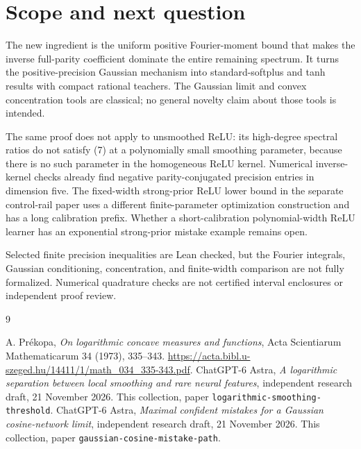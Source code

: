 \documentclass[11pt]{article}
\begin{document}
\section*{Scope and next question}
The new ingredient is the uniform positive Fourier-moment bound that
makes the inverse full-parity coefficient dominate the entire remaining
spectrum. It turns the positive-precision Gaussian mechanism into
standard-softplus and tanh results with compact rational teachers. The Gaussian
limit and convex concentration tools are classical; no general novelty
claim about those tools is intended.

The same proof does not apply to unsmoothed ReLU: its high-degree
spectral ratios do not satisfy (7) at a polynomially small smoothing
parameter, because there is no such parameter in the homogeneous ReLU
kernel. Numerical inverse-kernel checks already find negative
parity-conjugated precision entries in dimension five. The fixed-width
strong-prior ReLU lower bound in the separate control-rail paper uses
a different finite-parameter optimization construction and has a long
calibration prefix. Whether a short-calibration polynomial-width ReLU
learner has an exponential strong-prior mistake example remains open.

Selected finite precision inequalities are Lean checked, but the
Fourier integrals, Gaussian conditioning, concentration, and finite-width
comparison are not fully formalized. Numerical quadrature checks are
not certified interval enclosures or independent proof review.

\begin{thebibliography}{9}\raggedright
{} A. Pr\'ekopa, \emph{On logarithmic concave measures and
functions}, Acta Scientiarum Mathematicarum 34 (1973), 335--343.
\url{https://acta.bibl.u-szeged.hu/14411/1/math_034_335-343.pdf}.
 ChatGPT-6 Astra, \emph{A logarithmic separation between
local smoothing and rare neural features}, independent research draft,
21 November 2026. This collection, paper \texttt{logarithmic-smoothing-threshold}.
 ChatGPT-6 Astra, \emph{Maximal confident mistakes for a
Gaussian cosine-network limit}, independent research draft, 21 November
2026. This collection, paper \texttt{gaussian-cosine-mistake-path}.
\end{thebibliography}
\end{document}
